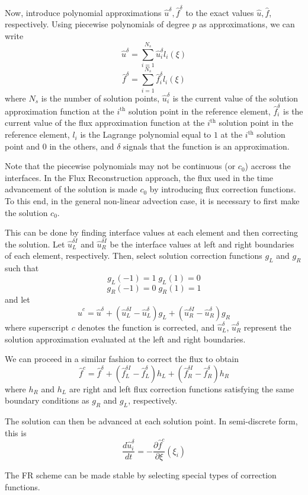 Now, introduce polynomial approximations $\hat{u}^\delta, \hat{f}^\delta$ to 
the exact values $\hat{u},\hat{f}$, respectively. Using piecewise polynomials of degree $p$ as 
approximations, we can write
$$
\hat{u}^\delta = \sum_{i=1}^{N_s} \hat{u}_i^\delta l_i(\xi)
$$
$$
\hat{f}^\delta = \sum_{i=1}^{N_s} \hat{f}_i^\delta l_i(\xi)
$$
where $N_s$ is the number of solution points, $\hat{u}_i^\delta$ is the current value of the 
solution approximation function at the $i^\text{th}$ solution point in the reference element, 
$\hat{f}_i^\delta$ is the current value of the flux approximation function at the $i^\text{th}$ 
solution point in the reference element, $l_i$ is the Lagrange polynomial equal to $1$ at the 
$i^\text{th}$ solution point and $0$ in the others, and $\delta$ signals that the function is an 
approximation.

Note that the piecewise polynomials may not be continuous (or $c_0$) accross the interfaces. In the 
Flux Reconstruction approach, the flux used in the time advancement of the solution is made $c_0$ 
by introducing flux correction functions. To this end, in the general non-linear advection case, it 
is necessary to first make the solution $c_0$.

This can be done by finding interface values at each element and then correcting the 
solution. Let $\hat{u}_L^{\delta I}$ and $\hat{u}_R^{\delta I}$ be the interface values at left and right 
boundaries of each element, respectively. Then, select solution correction functions $g_L$ and 
$g_R$ such 
that
$$
g_L(-1) = 1 \; g_L(1) = 0
$$
$$
g_R(-1) = 0 \; g_R(1) = 1
$$
and let
$$
\hat{u}^c = \hat{u}^\delta + (\hat{u}^{\delta I}_L - \hat{u}^\delta_L) g_L + (\hat{u}^{\delta I}_R 
- \hat{u}^\delta_R) g_R
$$
where superscript $c$ denotes the function is corrected, and $\hat{u}^\delta_L$, $\hat{u}^\delta_R$ 
represent the solution approximation evaluated at the left and right boundaries.

We can proceed in a similar fashion to correct the flux to obtain
$$
\hat{f}^c = \hat{f}^\delta + (\hat{f}^{\delta I}_L - \hat{f}^\delta_L) h_L + (\hat{f}^{\delta I}_R 
- \hat{f}^\delta_R) h_R
$$
where $h_R$ and $h_L$ are right and left flux correction functions satisfying the same boundary 
conditions as $g_R$ and $g_L$, respectively.

The solution can then be advanced at each solution point. In semi-discrete form, this is
$$
\frac{d \hat{u}_i^\delta}{d t} = - \frac{\partial \hat{f}^c}{\partial \xi}(\xi_i)
$$

The FR scheme can be made stable by selecting special types of correction functions.

